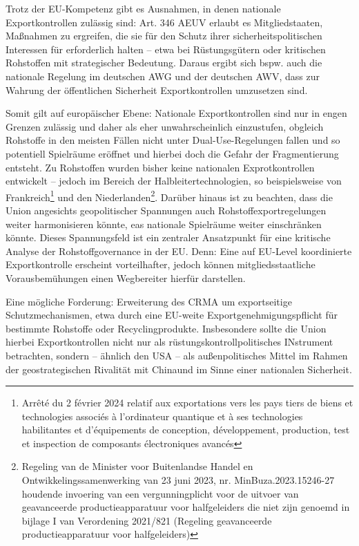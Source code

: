 \documentclass[12pt,a4paper,oneside]{book} %
\begin{document}
Trotz der EU-Kompetenz gibt es Ausnahmen, in denen nationale Exportkontrollen zulässig sind: Art. 346 AEUV erlaubt es Mitgliedstaaten, Maßnahmen zu ergreifen, die sie für den Schutz ihrer sicherheitspolitischen Interessen für erforderlich halten – etwa bei Rüstungsgütern oder kritischen Rohstoffen mit strategischer Bedeutung. Daraus ergibt sich bspw. auch die nationale Regelung im deutschen AWG und der deutschen AWV, dass zur Wahrung der öffentlichen Sicherheit Exportkontrollen umzusetzen sind.

Somit gilt auf europäischer Ebene: Nationale Exportkontrollen sind nur in engen Grenzen zulässig und daher als eher unwahrscheinlich einzustufen, obgleich Rohstoffe in den meisten Fällen nicht unter Dual-Use-Regelungen fallen und so potentiell Spielräume eröffnet und hierbei doch die Gefahr der Fragmentierung entsteht. Zu Rohstoffen wurden bisher keine nationalen Exprotkontrollen entwickelt -- jedoch im Bereich der Halbleitertechnologien, so beispielsweise von Frankreich\footnote{Arrêté du 2 février 2024 relatif aux exportations vers les pays tiers de biens et technologies associés à l'ordinateur quantique et à ses technologies habilitantes et d'équipements de conception, développement, production, test et inspection de composants électroniques avancés} und den Niederlanden\footnote{Regeling van de Minister voor Buitenlandse Handel en Ontwikkelingssamenwerking van 23 juni 2023, nr. MinBuza.2023.15246-27 houdende invoering van een vergunningplicht voor de uitvoer van geavanceerde productieapparatuur voor halfgeleiders die niet zijn genoemd in bijlage I van Verordening 2021/821 (Regeling geavanceerde productieapparatuur voor halfgeleiders)}.
Darüber hinaus ist zu beachten, dass die Union angesichts geopolitischer Spannungen auch Rohstoffexportregelungen weiter harmonisieren könnte, eas nationale Spielräume weiter einschränken könnte. Dieses Spannungsfeld ist ein zentraler Ansatzpunkt für eine kritische Analyse der Rohstoffgovernance in der EU. Denn: Eine auf EU-Level koordinierte Exportkontrolle erscheint vorteilhafter, jedoch können mitgliedsstaatliche Vorausbemühungen einen Wegbereiter hierfür darstellen.\autocite{Medunic, Nr 15 Juli 2024, S. 3}

Eine mögliche Forderung: Erweiterung des CRMA um exportseitige Schutzmechanismen, etwa durch eine EU-weite Exportgenehmigungspflicht für bestimmte Rohstoffe oder Recyclingprodukte. Insbesondere sollte die Union hierbei Exportkontrollen nicht nur als rüstungskontrollpolitisches INstrument betrachten, sondern -- ähnlich den USA -- als \glqq außenpolitisches Mittel im Rahmen der geostrategischen Rivalität mit China\grqq und im Sinne einer nationalen Sicherheit.\autocite{Medunic, Nr 15 Juli 2024, S. 3}
\end{document}
